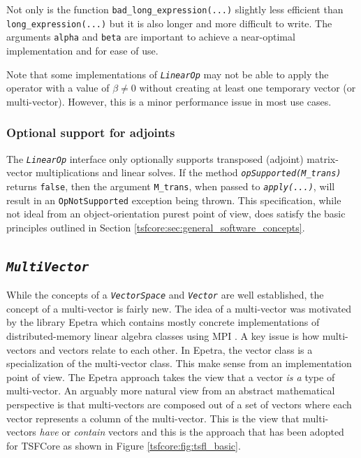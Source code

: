 Not only is the function {}\texttt{bad\-\_long\-\_expression(\-...)}
slightly less efficient than {}\texttt{long\-\_expression(\-...)} but
it is also longer and more difficult to write.  The arguments
{}\texttt{alpha} and {}\texttt{beta} are important to achieve a
near-optimal implementation and for ease of use.

Note that some implementations of {}\texttt{\textit{LinearOp}} may not
be able to apply the operator with a value of $\beta \ne 0$ without
creating at least one temporary vector (or multi-vector).  However,
this is a minor performance issue in most use cases.

%
\subsubsection{Optional support for adjoints}
\label{tsfcore:sec:linear_op_adjoints}
%

The {}\texttt{\textit{LinearOp}} interface only optionally supports
transposed (adjoint) matrix-vector multiplications and linear solves.
If the method {}\texttt{\textit{opSupported(M\_trans)}} returns
{}\texttt{false}, then the argument {}\texttt{M\_trans}, when passed
to {}\texttt{\textit{apply(\-...)}}, will result in an
{}\texttt{OpNotSupported} exception being thrown.  This specification,
while not ideal from an object-orientation purest point of view, does
satisfy the basic principles outlined in Section
{}\ref{tsfcore:sec:general_software_concepts}.

%
\subsection{\texttt{\textit{Multi\-Vector}}}
\label{tsfcore:sec:multi_vec}
%

While the concepts of a {}\texttt{\textit{VectorSpace}} and
{}\texttt{\textit{Vector}} are well established, the concept of a
multi-vector is fairly new.  The idea of a multi-vector was motivated
by the library Epetra {}\cite{ref:Epetra} which contains mostly
concrete implementations of distributed-memory linear algebra classes
using MPI {}\cite{ref:mpi}.  A key issue is how multi-vectors and
vectors relate to each other.  In Epetra, the vector class is a
specialization of the multi-vector class.  This make sense from an
implementation point of view.  The Epetra approach takes the view that
a vector {\em is a} type of multi-vector.  An arguably more natural
view from an abstract mathematical perspective is that multi-vectors
are composed out of a set of vectors where each vector represents a
column of the multi-vector.  This is the view that multi-vectors {\em
have} or {\em contain} vectors and this is the approach that has been
adopted for TSFCore as shown in Figure {}\ref{tsfcore:fig:tsfl_basic}.

